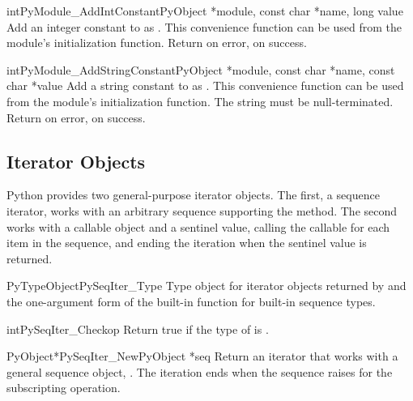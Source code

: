 \begin{cfuncdesc}{int}{PyModule_AddIntConstant}{PyObject *module,
                                                const char *name, long value}
  Add an integer constant to  as .  This
  convenience function can be used from the module's initialization
  function. Return  on error,  on success.
\end{cfuncdesc}

\begin{cfuncdesc}{int}{PyModule_AddStringConstant}{PyObject *module,
                                                   const char *name, const char *value}
  Add a string constant to  as .  This
  convenience function can be used from the module's initialization
  function.  The string  must be null-terminated.  Return
   on error,  on success.
\end{cfuncdesc}


\subsection{Iterator Objects \label{iterator-objects}}

Python provides two general-purpose iterator objects.  The first, a
sequence iterator, works with an arbitrary sequence supporting the
 method.  The second works with a callable
object and a sentinel value, calling the callable for each item in the
sequence, and ending the iteration when the sentinel value is
returned.

\begin{cvardesc}{PyTypeObject}{PySeqIter_Type}
  Type object for iterator objects returned by
   and the one-argument form of the
   built-in function for built-in sequence types.
\end{cvardesc}

\begin{cfuncdesc}{int}{PySeqIter_Check}{op}
  Return true if the type of  is .
\end{cfuncdesc}

\begin{cfuncdesc}{PyObject*}{PySeqIter_New}{PyObject *seq}
  Return an iterator that works with a general sequence object,
  .  The iteration ends when the sequence raises
   for the subscripting operation.
\end{cfuncdesc}

